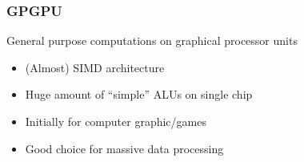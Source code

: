 \documentclass[xcolor=table]{beamer}
\begin{document}
\begin{frame}[fragile]
  \transwipe[direction=90]
  \frametitle{GPGPU}
  \begin{minipage}[m]{0.40\linewidth}
\end{minipage}\hfill
\begin{minipage}[m]{0.6\linewidth}
General purpose computations on graphical processor units
\begin{itemize}
      \item (Almost) SIMD architecture 
      \item Huge amount of ``simple'' ALUs on single chip
      \item Initially for computer graphic/games
      \item Good choice for massive data processing   
\end{itemize}

\end{minipage}

\end{frame}
\end{document}
